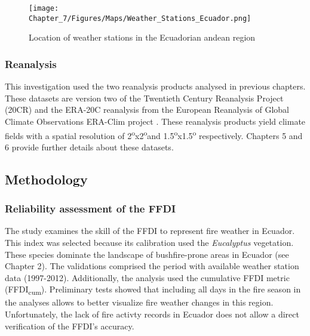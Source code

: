 \begin{figure}[h]
\noindent \begin{centering}
\texttt{[image: Chapter\_7/Figures/Maps/Weather\_Stations\_Ecuador.png]}
\par\end{centering}

\caption[Location of weather stations in the Ecuadorian andean region]{Location of weather stations in the Ecuadorian andean region \label{fig:Location of weather stations in the Ecuadorian andean region}}
\end{figure}



\subsubsection{Reanalysis}

This investigation used the two reanalysis products analysed in previous
chapters. These datasets are version two of the Twentieth Century
Reanalysis Project (20CR) \citep{Compo2011} and the ERA-20C reanalysis
from the European Reanalysis of Global Climate Observations ERA-Clim
project \citep{Stickler2014,Stickler2014a}. These reanalysis products
yield climate fields with a spatial resolution of 2\textsuperscript{o}x2\textsuperscript{o}and
1.5\textsuperscript{o}x1.5\textsuperscript{o} respectively. Chapters
5 and 6 provide further details about these datasets. 


\subsection{Methodology}


\subsubsection{Reliability assessment of the FFDI}

The study examines the skill of the FFDI to represent fire weather
in Ecuador. This index was selected because its calibration used the
\textit{Eucalyptus} vegetation. These species dominate the landscape
of bushfire-prone areas in Ecuador (see Chapter 2). The validations
comprised the period with available weather station data (1997-2012).
Additionally, the analysis used the cumulative FFDI metric (FFDI\textsubscript{cum}).
Preliminary tests showed that including all days in the fire season
in the analyses allows to better visualize fire weather changes in
this region. Unfortunately, the lack of fire activty records in Ecuador
does not allow a direct verification of the FFDI's accuracy. 

